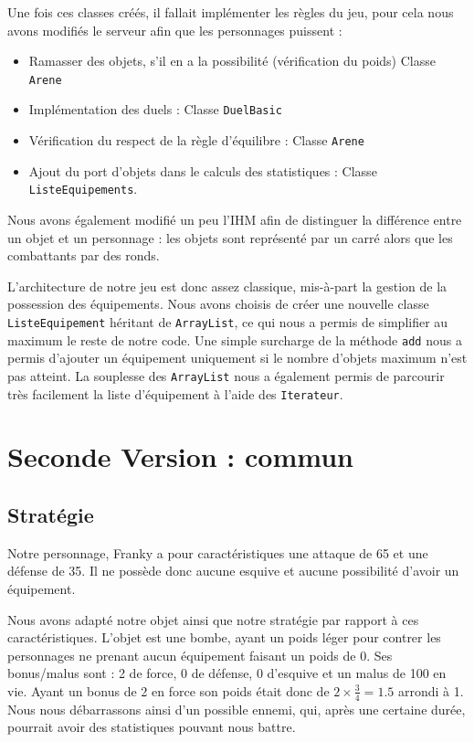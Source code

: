 \documentclass[12pt,a4paper,openany]{book}
\begin{document}
		Une fois ces classes créés, il fallait implémenter les règles du jeu, pour cela nous avons modifiés le serveur afin que les personnages puissent : 
		\begin{itemize}
			\item Ramasser des objets, s'il en a la possibilité (vérification du poids) Classe \texttt{Arene}
			\item Implémentation des duels : Classe \texttt{DuelBasic}
			\item Vérification du respect de la règle d'équilibre : Classe \texttt{Arene}
			\item Ajout du port d'objets dans le calculs des statistiques : Classe \texttt{ListeEquipements}.
		\end{itemize}

		Nous avons également modifié un peu l'IHM afin de distinguer la différence entre un objet et un personnage : les objets sont représenté par un carré
		alors que les combattants par des ronds.

		L'architecture de notre jeu est donc assez classique, mis-à-part la gestion de la possession des équipements. Nous avons choisis de créer une nouvelle
		classe \texttt{ListeEquipement} héritant de \texttt{ArrayList}, ce qui nous a permis de simplifier au maximum le reste de notre code. Une simple
		surcharge de la méthode \texttt{add} nous a permis d'ajouter un équipement uniquement si le nombre d'objets maximum n'est pas atteint. La souplesse des
		\texttt{ArrayList} nous a également permis de parcourir très facilement la liste d'équipement à l'aide des \texttt{Iterateur}.

	\chapter{Seconde Version : commun}
	\section{Stratégie}
Notre personnage, Franky a pour caractéristiques une attaque de 65 et une défense de 35. Il ne possède donc aucune esquive et aucune possibilité d’avoir un
équipement. 

Nous avons adapté notre objet ainsi que notre stratégie par rapport à ces caractéristiques. L'objet est une bombe, ayant un poids léger pour
contrer les personnages ne prenant aucun équipement faisant un poids de 0. Ses bonus/malus sont : 2 de force, 0 de défense, 0 d'esquive et un malus de
100 en vie. Ayant un bonus de 2 en force son poids était donc de $2 \times \frac{3}{4} = 1.5$ arrondi à 1. Nous nous débarrassons ainsi d’un possible ennemi, qui, après une certaine
durée, pourrait avoir des statistiques pouvant nous battre. 
\end{document}
